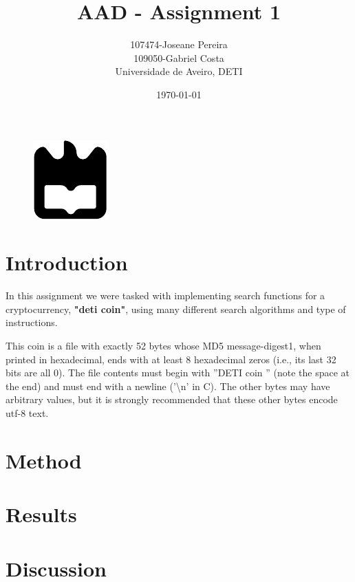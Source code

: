 \documentclass[a4paper,12pt]{article}
\title{AAD - Assignment 1}
\author{107474-Joseane Pereira \\
109050-Gabriel Costa \\
Universidade de Aveiro, DETI}
\date{\today}
\begin{document}
\begin{figure}
    \centering
    \includegraphics[width=0.3\linewidth]{ua.pdf}
    \label{fig:enter-label}
\end{figure}
\maketitle
\newpage
\tableofcontents
\newpage

\section{Introduction}
\label{sec:introduction}

In this assignment we were tasked with implementing search functions for a cryptocurrency,
\textbf{"deti coin"}, using many different search algorithms and type of instructions.

This coin is  a file with exactly 52 bytes whose MD5 message-digest1, when printed in hexadecimal,
ends with at least 8 hexadecimal zeros (i.e., its last 32 bits are all 0). The file contents must begin with
”DETI coin ” (note the space at the end) and must end with a newline (’\textbackslash n’ in C). The other bytes may
have arbitrary values, but it is strongly recommended that these other bytes encode utf-8 text. 

\section{Method}
\label{sec:method}

\section{Results}
\label{sec:results}

\section{Discussion}
\label{sec:discussion}
\end{document}
